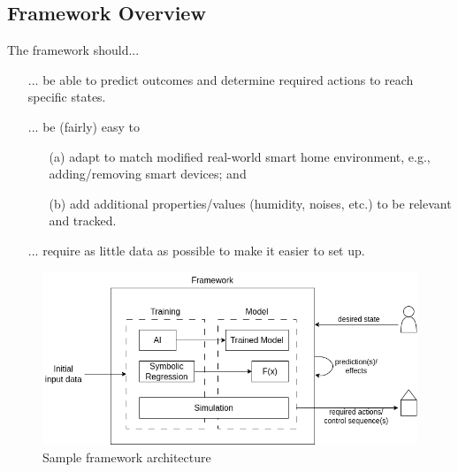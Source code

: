 \documentclass[a4paper,11pt]{article}
\begin{document}
\subsection{Framework Overview}
The framework should...
\begin{itemize}
    \item[...] be able to predict outcomes and determine required actions to reach specific states.
    \item[...] be (fairly) easy to 
        \begin{itemize}
            \item[(a)] adapt to match modified real-world smart home environment, e.g., adding/removing smart devices; and
            \item[(b)] add additional properties/values (humidity, noises, etc.) to be relevant and tracked.
        \end{itemize}
    \item[...] require as little data as possible to make it easier to set up.
\end{itemize}

\begin{figure}[h!]
    \centering
    \includegraphics[width=.75\textwidth]{sample_architecture.png}
    \caption{Sample framework architecture}
\end{figure}
\end{document}
